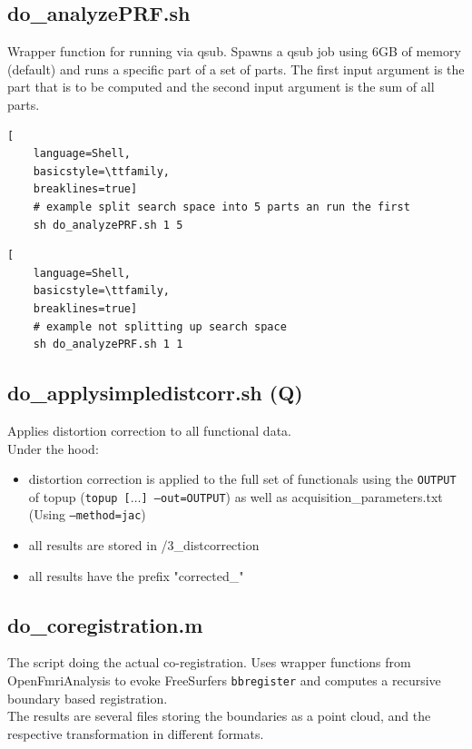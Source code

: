 \documentclass[12pt,a4paper]{scrartcl}
\begin{document}
\subsection{do\_analyzePRF.sh}
\label{sh:analyzePRF}
Wrapper function for running \texttt{} via qsub. Spawns a qsub job using 6GB of memory (default) and runs a specific part of a set of parts. The first input argument is the part that is to be computed and the second input argument is the sum of all parts.
\begin{lstlisting}[
    language=Shell,
    basicstyle=\ttfamily,
    breaklines=true]
    # example split search space into 5 parts an run the first
    sh do_analyzePRF.sh 1 5
\end{lstlisting}
\begin{lstlisting}[
    language=Shell,
    basicstyle=\ttfamily,
    breaklines=true]
    # example not splitting up search space
    sh do_analyzePRF.sh 1 1
\end{lstlisting}

\subsection{do\_applysimpledistcorr.sh (Q)}
\label{sh:applydistcorr}
Applies distortion correction to all functional data.\\

\noindent Under the hood:
\begin{itemize}
\item distortion correction is applied to the full set of functionals using the \texttt{OUTPUT} of topup (\texttt{topup [$\ldots$] --out=OUTPUT}) as well as acquisition\_parameters.txt (Using \texttt{--method=jac})
\item all results are stored in /3\_distcorrection
\item all results have the prefix "corrected\_"
\end{itemize}

\subsection{do\_coregistration.m}
\label{m:coreg}
The script doing the actual co-registration. Uses wrapper functions from OpenFmriAnalysis to evoke FreeSurfers \texttt{bbregister} and computes a recursive boundary based registration.\\

\noindent The results are several files storing the boundaries as a point cloud, and the respective transformation in different formats.
\end{document}
